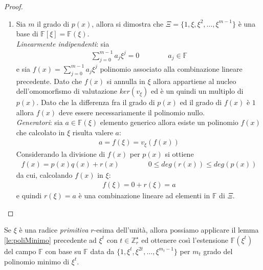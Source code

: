 \begin{proof}
\begin{enumerate}
      \item Sia $m$ il grado di $p(x)$, allora si dimostra che $\Xi = \lbrace1, \xi, \xi^2, \dots, \xi^{m-1} \rbrace$ è una base di $\mathbb{F}[\xi] = \mathbb{F}(\xi)$. \\
      \emph{Linearmente indipendenti}: sia
      \begin{align*}
         \sum_{j=0}^{m-1} a_{j}\xi^{j} = 0 \qquad \qquad a_{j} \in \mathbb{F}
      \end{align*}
      e sia $f(x) = \sum_{j=0}^{m-1} a_{j}\xi^{j}$ polinomio associato alla combinazione lineare precedente. Dato che $f(x)$ si annulla in $\xi$ allora appartiene al nucleo dell'omomorfismo di valutazione $ker(v_{\xi})$ ed è un quindi un multiplo di $p(x)$. Dato che la differenza fra il grado di $p(x)$ ed il grado di $f(x)$ è $1$ allora $f(x)$ deve essere necessariamente il polinomio nullo. \\
      \emph{Generatori}: sia $a \in \mathbb{F}(\xi)$ elemento generico allora esiste un polinomio $f(x)$ che calcolato in $\xi$ risulta valere $a$:
      \begin{align*}
         a = f(\xi) = v_{\xi}(f(x))
      \end{align*}
      Considerando la divisione di $f(x)$ per $p(x)$ si ottiene
      \begin{align*}
         f(x) = p(x)q(x) + r(x) \qquad \qquad 0 \leq deg(r(x)) \le deg(p(x))
      \end{align*}
      da cui, calcolando $f(x)$ in $\xi$:
      \begin{align*}
         f(\xi) = 0 + r(\xi) = a
      \end{align*}
      e quindi $r(\xi) = a$ è una combinazione lineare ad elementi in $\mathbb{F}$ di $\Xi$.
   \end{enumerate}
\end{proof}

\begin{osservazione}
   Se $\xi$ è una radice \emph{primitiva} $r$-esima dell'unità, allora possiamo applicare il lemma \ref{le:poliMinimo} precedente ad $\xi^{t}$ con $t \in \mathbb{Z}_{r}^{\star}$ ed ottenere così l'estensione $\mathbb{F}(\xi^{t})$ del campo $\mathbb{F}$ con base su $\mathbb{F}$ data da $\lbrace 1, \xi^{t}, \xi^{2t}, \dots, \xi^{m_{t} - 1} \rbrace$ per $m_{t}$ grado del polinomio minimo di $\xi^{t}$.
\end{osservazione}

